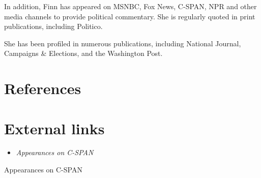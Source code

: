 In addition, Finn has appeared on MSNBC, Fox News, C-SPAN, NPR and other
media channels to provide political commentary. She is regularly quoted
in print publications, including Politico.

She has been profiled in numerous publications, including National
Journal, Campaigns \& Elections, and the Washington Post.

\section{References}\label{references}

\section{External links}\label{external-links}

\begin{itemize}
\item
  \emph{Appearances on C-SPAN}
\end{itemize}

Appearances on C-SPAN

